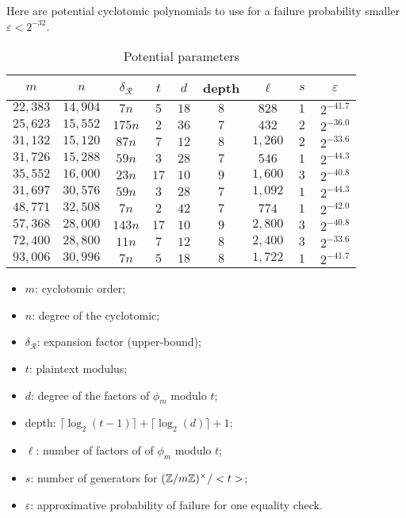 Here are potential cyclotomic polynomials to use for a failure probability smaller $\varepsilon < 2^{-32}$.

\begin{table}
  \setlength{\tabcolsep}{1em}
  \centering
  \begin{tabular}{||ccc||ccc|cc|c||}
    \hline
    $~m~$ & $~n~$ & $~\delta_\mathcal{R}~$ & $~t~$ & $~d~$ & depth & $~\ell~$ & $~s~$ & $~\varepsilon~$ \\
    \hline
    $22,383$ & $14,904$ & $7n$ & $5$  & $18$ & $8$ & $828$  & $1$ &  $2^{-41.7}$ \\
    $25,623$ & $15,552$ & $175n$ & $2$ & $36$ & $7$ & $432$ & $2$ & $2^{-36.0}$ \\
    $31,132$ & $15,120$ & $87n$ & $7$ & $12$ & $8$ & $1,260$ & $2$ & $2^{-33.6}$ \\
    $31,726$ & $15,288$ & $59n$ & $3$ & $28$ & $7$ & $546$ & $1$ & $2^{-44.3}$ \\
    $35,552$ & $16,000$ & $23n$ & $17$ & $10$ & $9$ & $1,600$ & $3$ & $2^{-40.8}$ \\
    \hline
    $31,697$ & $30,576$ & $59n$ & $3$ & $28$ & $7$ & $1,092$ & $1$ & $2^{-44.3}$ \\
    $48,771$ & $32,508$ & $7n$ & $2$ & $42$ & $7$ & $774$ & $1$ & $2^{-42.0}$ \\
    $57,368$ & $28,000$ & $143n$ & $17$ & $10$ & $9$ & $2,800$ & $3$ & $2^{-40.8}$ \\
    $72,400$ & $28,800$ & $11n$ & $7$ & $12$ & $8$ & $2,400$ & $3$ & $2^{-33.6}$ \\
    $93,006$ & $30,996$ & $7n$ & $5$ & $18$ & $8$ & $1,722$ & $1$ & $2^{-41.7}$ \\
    \hline
                                                   
  \end{tabular}
  \caption{Potential parameters}
  \label{tab:params}
\end{table}

\begin{itemize}
\item $m$: cyclotomic order;
\item $n$: degree of the cyclotomic;
\item $\delta_\mathcal{R}$: expansion factor (upper-bound);
\item $t$: plaintext modulus;
\item $d$: degree of the factors of $\phi_m$ modulo $t$;
\item depth: $\lceil \log_2(t-1) \rceil + \lceil \log_2(d)\rceil + 1$;
\item $\ell$: number of factors of of $\phi_m$ modulo $t$;
\item $s$: number of generators for $(\mathbb{Z}/m\mathbb{Z})^\times/<t>$;
\item $\varepsilon$: approximative probability of failure for one equality check.
\end{itemize}

